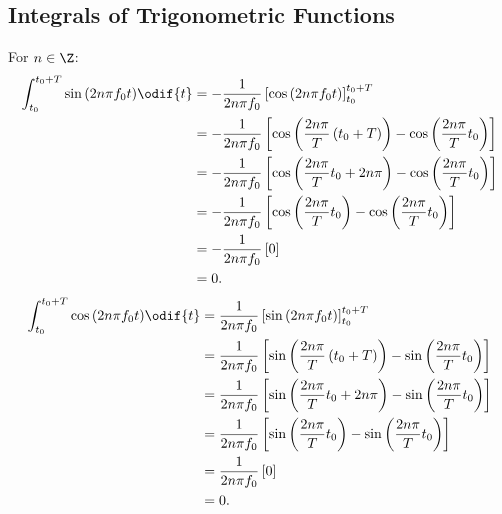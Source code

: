 \documentclass{article}
\begin{document}
\subsection{Integrals of Trigonometric Functions}
For \(n \in \Z\):
\begin{align*}
    \int_{t_0}^{t_0 + T} \sin{\left( 2n \pi f_0 t \right)} \odif{t} & = - \frac{1}{2n \pi f_0} \left[ \cos{\left( 2n \pi f_0 t \right)} \right]_{t_0}^{t_0 + T}                                                        \\
                                                                    & = - \frac{1}{2n \pi f_0} \left[ \cos{\left( \frac{2n \pi}{T} \left( t_0 + T \right) \right)} - \cos{\left( \frac{2n \pi}{T} t_0 \right)} \right] \\
                                                                    & = - \frac{1}{2n \pi f_0} \left[ \cos{\left( \frac{2n \pi}{T} t_0 + 2n \pi \right)} - \cos{\left( \frac{2n \pi}{T} t_0 \right)} \right]           \\
                                                                    & = - \frac{1}{2n \pi f_0} \left[ \cos{\left( \frac{2n \pi}{T} t_0 \right)} - \cos{\left( \frac{2n \pi}{T} t_0 \right)} \right]                    \\
                                                                    & = - \frac{1}{2n \pi f_0} \left[ 0 \right]                                                                                                        \\
                                                                    & = 0.
\end{align*}
\begin{align*}
    \int_{t_0}^{t_0 + T} \cos{\left( 2n \pi f_0 t \right)} \odif{t} & = \frac{1}{2n \pi f_0} \left[ \sin{\left( 2n \pi f_0 t \right)} \right]_{t_0}^{t_0 + T}                                                        \\
                                                                    & = \frac{1}{2n \pi f_0} \left[ \sin{\left( \frac{2n \pi}{T} \left( t_0 + T \right) \right)} - \sin{\left( \frac{2n \pi}{T} t_0 \right)} \right] \\
                                                                    & = \frac{1}{2n \pi f_0} \left[ \sin{\left( \frac{2n \pi}{T} t_0 + 2n \pi \right)} - \sin{\left( \frac{2n \pi}{T} t_0 \right)} \right]           \\
                                                                    & = \frac{1}{2n \pi f_0} \left[ \sin{\left( \frac{2n \pi}{T} t_0 \right)} - \sin{\left( \frac{2n \pi}{T} t_0 \right)} \right]                    \\
                                                                    & = \frac{1}{2n \pi f_0} \left[ 0 \right]                                                                                                        \\
                                                                    & = 0.
\end{align*}
\end{document}
